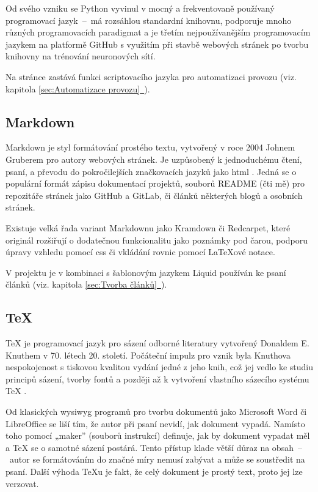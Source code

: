 \documentclass[a4paper, 12pt]{article}
\newcommand*{\fullref}[1]{\hyperref[{#1}]{\ref*{#1}~\nameref*{#1}}}
\begin{document}
  Od svého vzniku se Python vyvinul v mocný a frekventovaně používaný programovací jazyk~--~má rozsáhlou standardní knihovnu, podporuje mnoho různých programovacích paradigmat a je třetím nejpoužívanějším programovacím jazykem na platformě GitHub \cite{github-statistics} s využitím při stavbě webových stránek po tvorbu knihovny na trénování neuronových sítí.

  Na stránce zastává funkci scriptovacího jazyka pro automatizaci provozu (viz. kapitola \fullref{sec:Automatizace provozu}).


  \subsection{Markdown} \label{sec:Markdown}
  Markdown je styl formátování prostého textu, vytvořený v roce 2004 Johnem Gruberem pro autory webových stránek. Je uzpůsobený k jednoduchému čtení, psaní, a převodu do pokročilejších značkovacích jazyků jako \gls{html} \cite{markdown-history}. Jedná se o populární formát zápisu dokumentací projektů, souborů README (čti mě) pro repozitáře stránek jako GitHub a GitLab, či článků některých blogů a osobních stránek.

  Existuje velká řada variant Markdownu jako Kramdown či Redcarpet, které originál rozšiřují o dodatečnou funkcionalitu jako poznámky pod čarou, podporu úpravy vzhledu pomocí \gls{css} či vkládání rovnic pomocí \LaTeX ové notace.

  V projektu je v kombinaci s šablonovým jazykem Liquid používán ke psaní článků (viz. kapitola \fullref{sec:Tvorba článků}).


  \subsection{\TeX} \label{sec:TeX}
  \TeX{} je programovací jazyk pro sázení odborné literatury vytvořený Donaldem E. Knuthem v 70. létech 20. století. Počáteční impulz pro vznik byla Knuthova nespokojenost s tiskovou kvalitou vydání jedné z jeho knih, což jej vedlo ke studiu principů sázení, tvorby fontů a později až k vytvoření vlastního sázecího systému \TeX{} \cite{tex-history}.

  Od klasických \gls{wysiwyg} programů pro tvorbu dokumentů jako Microsoft Word či LibreOffice se liší tím, že autor při psaní nevidí, jak dokument vypadá. Namísto toho pomocí „maker” (souborů instrukcí) definuje, jak by dokument vypadat měl a \TeX{} se o samotné sázení postárá. Tento přístup klade větší důraz na obsah~--~autor se formátováním do značné míry nemusí zabývat a může se soustředit na psaní. Další výhoda \TeX u je fakt, že celý dokument je prostý text, proto jej lze verzovat.
\end{document}
